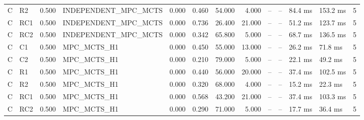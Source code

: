 \begin{table}
{\begin{tabular}{llrlrrrrrrllr}
C & R2 & 0.500 & INDEPENDENT\_MPC\_MCTS & 0.000 & 0.460 & 54.000 & 4.000 & -- & -- & 84.4 ms & 153.2 ms & 5 \\
C & RC1 & 0.500 & INDEPENDENT\_MPC\_MCTS & 0.000 & 0.736 & 26.400 & 21.000 & -- & -- & 51.2 ms & 123.7 ms & 5 \\
C & RC2 & 0.500 & INDEPENDENT\_MPC\_MCTS & 0.000 & 0.342 & 65.800 & 5.000 & -- & -- & 68.7 ms & 136.5 ms & 5 \\
C & C1 & 0.500 & MPC\_MCTS\_H1 & 0.000 & 0.450 & 55.000 & 13.000 & -- & -- & 26.2 ms & 71.8 ms & 5 \\
C & C2 & 0.500 & MPC\_MCTS\_H1 & 0.000 & 0.210 & 79.000 & 5.000 & -- & -- & 22.1 ms & 49.2 ms & 5 \\
C & R1 & 0.500 & MPC\_MCTS\_H1 & 0.000 & 0.440 & 56.000 & 20.000 & -- & -- & 37.4 ms & 102.5 ms & 5 \\
C & R2 & 0.500 & MPC\_MCTS\_H1 & 0.000 & 0.320 & 68.000 & 4.000 & -- & -- & 15.2 ms & 22.3 ms & 5 \\
C & RC1 & 0.500 & MPC\_MCTS\_H1 & 0.000 & 0.568 & 43.200 & 21.000 & -- & -- & 37.4 ms & 103.3 ms & 5 \\
C & RC2 & 0.500 & MPC\_MCTS\_H1 & 0.000 & 0.290 & 71.000 & 5.000 & -- & -- & 17.7 ms & 36.4 ms & 5 \\
\bottomrule
\end{tabular}
}
\end{table}
